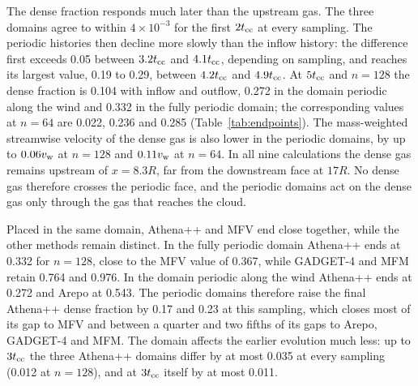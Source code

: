 \documentclass[twocolumn,apj,numberedappendix]{openjournal}
\begin{document}
The dense fraction responds much later than the upstream gas. The three domains agree to within $4\times10^{-3}$ for the first $2t_{\rm cc}$ at every sampling. The periodic histories then decline more slowly than the inflow history: the difference first exceeds 0.05 between $3.2t_{\rm cc}$ and $4.1t_{\rm cc}$, depending on sampling, and reaches its largest value, 0.19 to 0.29, between $4.2t_{\rm cc}$ and $4.9t_{\rm cc}$. At $5t_{\rm cc}$ and $n=128$ the dense fraction is 0.104 with inflow and outflow, 0.272 in the domain periodic along the wind and 0.332 in the fully periodic domain; the corresponding values at $n=64$ are 0.022, 0.236 and 0.285 (Table~\ref{tab:endpoints}). The mass-weighted streamwise velocity of the dense gas is also lower in the periodic domains, by up to $0.06v_{\rm w}$ at $n=128$ and $0.11v_{\rm w}$ at $n=64$. In all nine calculations the dense gas remains upstream of $x=8.3R$, far from the downstream face at $17R$. No dense gas therefore crosses the periodic face, and the periodic domains act on the dense gas only through the gas that reaches the cloud.

Placed in the same domain, Athena++ and MFV end close together, while the other methods remain distinct. In the fully periodic domain Athena++ ends at 0.332 for $n=128$, close to the MFV value of 0.367, while GADGET-4 and MFM retain 0.764 and 0.976. In the domain periodic along the wind Athena++ ends at 0.272 and Arepo at 0.543. The periodic domains therefore raise the final Athena++ dense fraction by 0.17 and 0.23 at this sampling, which closes most of its gap to MFV and between a quarter and two fifths of its gaps to Arepo, GADGET-4 and MFM. The domain affects the earlier evolution much less: up to $3t_{\rm cc}$ the three Athena++ domains differ by at most 0.035 at every sampling (0.012 at $n=128$), and at $3t_{\rm cc}$ itself by at most 0.011.
\end{document}
